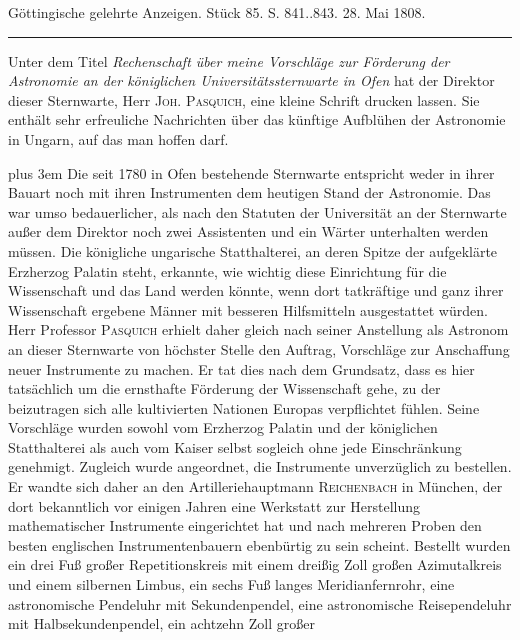 \clearpage
{}
\hypertarget{native-502-lower}{}\label{native-502-lower}
\begin{center}
\small Göttingische gelehrte Anzeigen. Stück 85. S. 841..843. 28. Mai 1808.\\[3pt]
\rule{.72\linewidth}{.3pt}
\end{center}

Unter dem Titel \emph{Rechenschaft über meine Vorschläge zur Förderung der Astronomie an der königlichen Universitätssternwarte in Ofen} hat der Direktor dieser Sternwarte, Herr \textsc{Joh. Pasquich}, eine kleine Schrift drucken lassen. Sie enthält sehr erfreuliche Nachrichten über das künftige Aufblühen der Astronomie in Ungarn, auf das man hoffen darf.

{\rightskip=0pt plus 3em Die seit 1780 in Ofen bestehende Sternwarte entspricht weder in ihrer Bauart noch mit ihren Instrumenten dem heutigen Stand der Astronomie. Das war umso bedauerlicher, als nach den Statuten der Universität an der Sternwarte außer dem Direktor noch zwei Assistenten und ein Wärter unterhalten werden müssen. Die königliche ungarische Statthalterei, an deren Spitze der aufgeklärte Erzherzog Palatin steht, erkannte, wie wichtig diese Einrichtung für die Wissenschaft und das Land werden könnte, wenn dort tatkräftige und ganz ihrer Wissenschaft ergebene Männer mit besseren Hilfsmitteln ausgestattet würden. Herr Professor \textsc{Pasquich} erhielt daher gleich nach seiner Anstellung als Astronom an dieser Sternwarte von höchster Stelle den Auftrag, Vorschläge zur Anschaffung neuer Instrumente zu machen. Er tat dies nach dem Grundsatz, dass es hier tatsächlich um die ernsthafte Förderung der Wissenschaft gehe, zu der beizutragen sich alle kultivierten Nationen Europas verpflichtet fühlen. Seine Vorschläge wurden sowohl vom Erzherzog Palatin und der königlichen Statthalterei als auch vom Kaiser selbst sogleich ohne jede Einschränkung genehmigt. Zugleich wurde angeordnet, die Instrumente unverzüglich zu bestellen. Er wandte sich daher an den Artilleriehauptmann \textsc{Reichenbach} in München, der dort bekanntlich vor einigen Jahren eine Werkstatt zur Herstellung mathematischer Instrumente eingerichtet hat und nach mehreren Proben den besten englischen Instrumentenbauern ebenbürtig zu sein scheint. Bestellt wurden ein drei Fuß großer Repetitionskreis mit einem dreißig Zoll großen Azimutalkreis und einem silbernen Limbus, ein sechs Fuß langes Meridianfernrohr, eine astronomische Pendeluhr mit Sekundenpendel, eine astronomische Reisependeluhr mit Halbsekundenpendel, ein achtzehn Zoll großer
}
